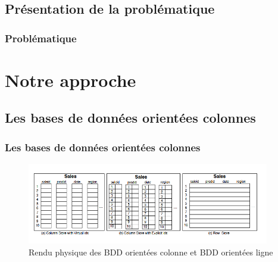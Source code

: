 \documentclass[a4paper,12pt]{beamer}
\begin{document}
\subsection{Présentation de la problématique}



\begin{frame}[containsverbatim] %
    \frametitle{Problématique}
\centering




\end{frame}


\section{Notre approche}
\subsection{Les bases de données orientées colonnes}
\begin{frame}
    \frametitle{Les bases de données orientées colonnes}
    \begin{figure}[h]
		\centering
		\includegraphics[width=300pt]{ressource/row_vs_column.png}
        \caption{Rendu physique des BDD orientées colonne et BDD orientées ligne}
	\end{figure}
\end{frame}
\end{document}
